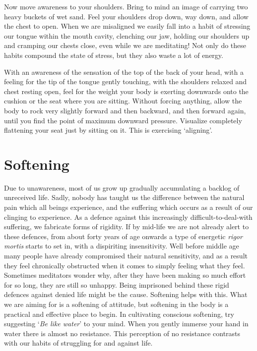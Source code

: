 Now move awareness to your shoulders. Bring to mind an image of carrying
two heavy buckets of wet sand. Feel your shoulders drop down, way down,
and allow the chest to open. When we are misaligned we easily fall into
a habit of stressing our tongue within the mouth cavity, clenching our
jaw, holding our shoulders up and cramping our chests close, even while
we are meditating! Not only do these habits compound the state of
stress, but they also waste a lot of energy.

With an awareness of the sensation of the top of the back of your head,
with a feeling for the tip of the tongue gently touching, with the
shoulders relaxed and chest resting open, feel for the weight your body
is exerting downwards onto the cushion or the seat where you are
sitting. Without forcing anything, allow the body to rock very slightly
forward and then backward, and then forward again, until you find the
point of maximum downward pressure. Visualize completely flattening your
seat just by sitting on it. This is exercising `aligning'.

\section{Softening}

Due to unawareness, most of us grow up gradually accumulating a backlog
of unreceived life. Sadly, nobody has taught us the difference between the
natural pain which all beings experience, and the suffering which occurs
as a result of our clinging to experience. As a defence against this
increasingly difficult-to-deal-with suffering, we fabricate forms of
rigidity. If by mid-life we are not already alert to these defences,
from about forty years of age onwards a type of energetic \emph{rigor
mortis} starts to set in, with a dispiriting insensitivity. Well before
middle age many people have already compromised their natural
sensitivity, and as a result they feel chronically obstructed when it
comes to simply feeling what they feel. Sometimes meditators wonder why,
after they have been making so much effort for so long, they are still
so unhappy. Being imprisoned behind these rigid defences against denied
life might be the cause. Softening helps with this. What we are aiming
for is a softening of attitude, but softening in the body is a practical
and effective place to begin. In cultivating conscious softening, try
suggesting `\emph{Be like water}' to your mind. When you gently immerse
your hand in water there is almost no resistance. This perception of no
resistance contrasts with our habits of struggling for and against life.

